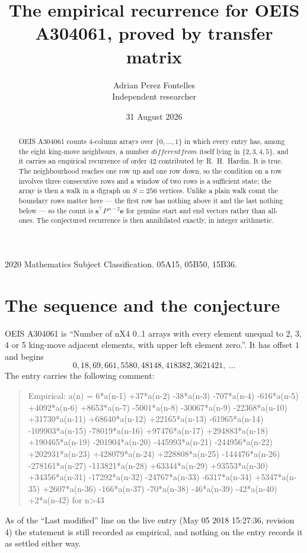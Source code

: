 \documentclass[11pt,a4paper]{article}
\title{The empirical recurrence for OEIS A304061, proved by transfer matrix}
\author{Adrian Perez Fontelles\\ \small Independent researcher}
\date{31 August 2026}
\theoremstyle{plain}
\theoremstyle{definition}
\begin{document}
\maketitle

\begin{abstract}
OEIS A304061 counts $4$-column arrays over $\{0,\dots,1\}$ in which every entry has,
among the eight king-move neighbours, a number $different from$ itself lying in $\{2,3,4,5\}$, and it carries an empirical
recurrence of order $42$ contributed by R.~H.~Hardin. It is true. The neighbourhood
reaches one row up and one row down, so the condition on a row involves three consecutive
rows and a window of two rows is a sufficient state; the array is then a walk in a digraph
on $S=256$ vertices. Unlike a plain walk count the boundary rows matter here --- the first
row has nothing above it and the last nothing below --- so the count is
$\mathbf{s}^{\!\top}P^{\,n-2}\mathbf{e}$ for genuine start and end vectors rather than
all-ones. The conjectured recurrence is then annihilated exactly, in integer arithmetic.
\end{abstract}

\noindent\small 2020 Mathematics Subject Classification. 05A15, 05B50, 15B36.\normalsize

\section{The sequence and the conjecture}

OEIS A304061 is ``Number of nX4 0..1 arrays with every element unequal to 2, 3, 4 or 5 king-move adjacent elements, with upper left element zero.''. It has offset
$1$ and begins
\[
0, 18, 69, 661, 5580, 48148, 418382, 3621421,\ \dots
\]
The entry carries the following comment:
\begin{quote}\small
Empirical: a(n) = 6*a(n-1) +37*a(n-2) -38*a(n-3) -707*a(n-4) -616*a(n-5) +4092*a(n-6) +8653*a(n-7) -5001*a(n-8) -30067*a(n-9) -22368*a(n-10) +31730*a(n-11) +68640*a(n-12) +22165*a(n-13) -61965*a(n-14) -109903*a(n-15) -78019*a(n-16) +97476*a(n-17) +294883*a(n-18) +190465*a(n-19) -201904*a(n-20) -445993*a(n-21) -244956*a(n-22) +202931*a(n-23) +428079*a(n-24) +228808*a(n-25) -144476*a(n-26) -278161*a(n-27) -113821*a(n-28) +63344*a(n-29) +93553*a(n-30) +34356*a(n-31) -17292*a(n-32) -24767*a(n-33) -6317*a(n-34) +5347*a(n-35) +2607*a(n-36) -166*a(n-37) -70*a(n-38) -46*a(n-39) -42*a(n-40) +2*a(n-42) for n>43
\end{quote}
As of the ``Last modified'' line on the live entry (May 05 2018 15:27:36, revision
4) the statement is still recorded as empirical, and nothing on the entry
records it as settled either way.
\end{document}
